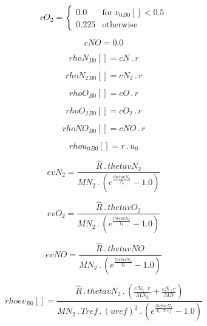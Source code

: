 \documentclass{article}
\begin{document}
\begin{dmath}cO_{2} = \begin{cases} 0.0 & \text{for}\: {x_{0}{_{B0}}}[{}] < 0.5 \\0.225 & \text{otherwise} \end{cases}\end{dmath}

\begin{dmath}cNO = 0.0\end{dmath}

\begin{dmath}{rhoN{_{B0}}}[{}] = cN \,.\, r\end{dmath}

\begin{dmath}{rhoN_{2}{_{B0}}}[{}] = cN_{2} \,.\, r\end{dmath}

\begin{dmath}{rhoO{_{B0}}}[{}] = cO \,.\, r\end{dmath}

\begin{dmath}{rhoO_{2}{_{B0}}}[{}] = cO_{2} \,.\, r\end{dmath}

\begin{dmath}{rhoNO{_{B0}}}[{}] = cNO \,.\, r\end{dmath}

\begin{dmath}{rhou_{0}{_{B0}}}[{}] = r \,.\, u_{0}\end{dmath}

\begin{dmath}evN_{2} = \frac{\hat{R} \,.\, thetavN_{2}}{MN_{2} \,.\, \left(e^{\frac{thetavN_{2}}{T_{0}}} - 1.0\right)}\end{dmath}

\begin{dmath}evO_{2} = \frac{\hat{R} \,.\, thetavO_{2}}{MN_{2} \,.\, \left(e^{\frac{thetavN_{2}}{T_{0}}} - 1.0\right)}\end{dmath}

\begin{dmath}evNO = \frac{\hat{R} \,.\, thetavNO}{MN_{2} \,.\, \left(e^{\frac{thetavN_{2}}{T_{0}}} - 1.0\right)}\end{dmath}

\begin{dmath}{rhoev{_{B0}}}[{}] = \frac{\hat{R} \,.\, thetavN_{2} \,.\, \left(\frac{cN_{2} \,.\, r}{MN_{2}} + \frac{cN \,.\, r}{MN}\right)}{MN_{2} \,.\, Tref \,.\, \left(uref \right)^{2} \,.\, \left(e^{\frac{thetavN_{2}}{T_{0} \,.\, Tref}} - 
1.0\right)}\end{dmath}
\end{document}
